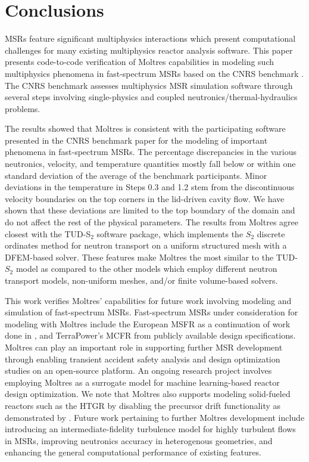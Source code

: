 \section{Conclusions}

\glspl{MSR} feature significant multiphysics interactions which present
computational challenges for many existing multiphysics reactor analysis
software. This paper presents code-to-code verification of Moltres
capabilities in modeling such multiphysics phenomena in fast-spectrum
\glspl{MSR} based on the CNRS benchmark \cite{tiberga_results_2020}.
The CNRS benchmark assesses multiphysics \gls{MSR} simulation
software through several steps involving single-physics and coupled
neutronics/thermal-hydraulics problems.

The results showed that Moltres is consistent with the participating software
presented in the CNRS benchmark paper for the modeling of important phenomena
in fast-spectrum \glspl{MSR}. The percentage discrepancies in the various
neutronics, velocity, and temperature quantities mostly fall below or within
one standard deviation of the average of the benchmark participants.
Minor deviations in the temperature in Steps 0.3 and 1.2 
stem from the discontinuous velocity
boundaries on the top corners in the lid-driven cavity flow. We have shown that
these deviations are limited to the top boundary of the domain and do not
affect the rest of the physical parameters. The results from
Moltres agree closest with the TUD-S$_2$ software package, which implements the
$S_2$ discrete ordinates method for
neutron transport on a uniform structured mesh with a \gls{DFEM}-based solver.
These features make Moltres the most similar to the TUD-$S_2$ model as compared
to the other models which employ different neutron transport models,
non-uniform meshes, and/or finite volume-based solvers.

This work verifies Moltres' capabilities for future work involving modeling and
simulation of fast-spectrum \glspl{MSR}. Fast-spectrum \glspl{MSR}
under consideration for modeling with Moltres include the European \gls{MSFR}
as a continuation of work done in \cite{park_advancement_2020}, and
TerraPower's \gls{MCFR} \cite{terrapower_terrapower_2021} from publicly
available design specifications. Moltres can play an important role in
supporting further \gls{MSR} development through enabling transient accident
safety analysis and design optimization studies on an open-source platform.
An ongoing research project involves employing Moltres as a
surrogate model for machine learning-based reactor design optimization.
We note that Moltres also supports modeling solid-fueled reactors such as the
\gls{HTGR} by disabling the precursor drift functionality as demonstrated by
\cite{fairhurst-agosta_multi-physics_2020}. Future work pertaining to
further Moltres development include introducing an intermediate-fidelity
turbulence model for highly turbulent flows in \glspl{MSR}, improving
neutronics accuracy in heterogenous geometries, and enhancing the general
computational performance of existing features.

\FloatBarrier
